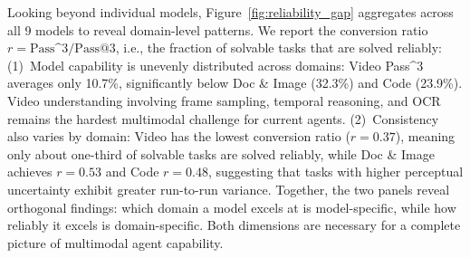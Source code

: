 \documentclass{article}
\begin{document}
Looking beyond individual models, Figure~\ref{fig:reliability_gap} aggregates across all 9 models to reveal domain-level patterns. We report the conversion ratio $r = \text{Pass\textasciicircum{}3} / \text{Pass@3}$, i.e., the fraction of solvable tasks that are solved reliably:
(1)~Model capability is unevenly distributed across domains: Video Pass\textasciicircum{}3 averages only 10.7\%, significantly below Doc \& Image (32.3\%) and Code (23.9\%). Video understanding involving frame sampling, temporal reasoning, and OCR remains the hardest multimodal challenge for current agents.
(2)~Consistency also varies by domain: Video has the lowest conversion ratio ($r = 0.37$), meaning only about one-third of solvable tasks are solved reliably, while Doc \& Image achieves $r = 0.53$ and Code $r = 0.48$, suggesting that tasks with higher perceptual uncertainty exhibit greater run-to-run variance.
Together, the two panels reveal orthogonal findings: which domain a model excels at is model-specific, while how reliably it excels is domain-specific. Both dimensions are necessary for a complete picture of multimodal agent capability.
\end{document}
